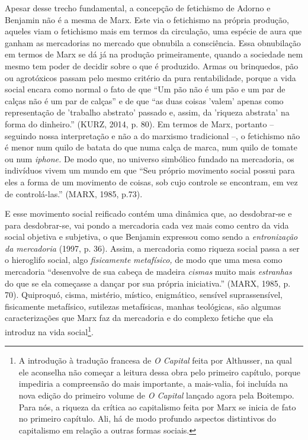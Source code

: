 Apesar desse trecho fundamental, a concepção de fetichismo de Adorno e
Benjamin não é a mesma de Marx. Este via o fetichismo na própria
produção, aqueles viam o fetichismo mais em termos da circulação, uma
espécie de aura que ganham as mercadorias no mercado que obnubila a
consciência. Essa obnubilação em termos de Marx se dá já na produção
primeiramente, quando a sociedade nem mesmo tem poder de decidir sobre o
que é produzido. Armas ou brinquedos, pão ou agrotóxicos passam pelo
mesmo critério da pura rentabilidade, porque a vida social encara como
normal o fato de que ``Um pão não é um pão e um par de calças não é um
par de calças'' e de que ``as duas coisas 'valem' apenas como
representação de 'trabalho abstrato' passado e, assim, da 'riqueza
abstrata' na forma do dinheiro.'' (KURZ, 2014, p. 80). Em termos de
Marx, portanto -- seguindo nossa interpretação e não a do marxismo
tradicional --, o fetichismo não é menor num quilo de batata do que numa
calça de marca, num quilo de tomate ou num \emph{iphone.} De modo que,
no universo simbólico fundado na mercadoria, os indivíduos vivem um
mundo em que ``Seu próprio movimento social possui para eles a forma de
um movimento de coisas, sob cujo controle se encontram, em vez de
controlá-las.'' (MARX, 1985, p.73).

E esse movimento social reificado contém uma dinâmica que, ao
desdobrar-se e para desdobrar-se, vai pondo a mercadoria cada vez mais
como centro da vida social objetiva e subjetiva, o que Benjamin
expressou como sendo a \emph{entronização da mercadoria} (1997, p. 36).
Assim, a mercadoria como riqueza social passa a ser o hieroglifo social,
algo \emph{fisicamente} \emph{metafísico,} de modo que uma mesa como
mercadoria ``desenvolve de sua cabeça de madeira \emph{cismas} muito
mais \emph{estranhas} do que se ela começasse a dançar por sua própria
iniciativa.'' (MARX, 1985, p. 70). Quiproquó, cisma, mistério, místico,
enigmático, sensível suprassensível, fisicamente metafísico, sutilezas
metafísicas, manhas teológicas, são algumas caracterizações que Marx faz
da mercadoria e do complexo fetiche que ela introduz na vida
social\footnote{A introdução à tradução francesa de \emph{O Capital}
  feita por Althusser, na qual ele aconselha não começar a leitura dessa
  obra pelo primeiro capítulo, porque impediria a compreensão do mais
  importante, a mais-valia, foi incluída na nova edição do primeiro
  volume de \emph{O Capital} lançado agora pela Boitempo. Para nós, a
  riqueza da crítica ao capitalismo feita por Marx se inicia de fato no
  primeiro capítulo. Ali, há de modo profundo aspectos distintivos do
  capitalismo em relação a outras formas sociais.}.

